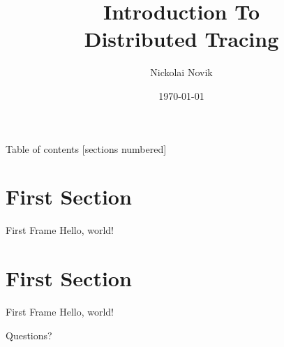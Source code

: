 \documentclass{beamer}
\title{Introduction To \\ Distributed Tracing}
\date{\today}
\author{Nickolai Novik}
\institute{DataRobot}
\begin{document}
  \maketitle

  \begin{frame}{Table of contents}
    [sections numbered]
    \tableofcontents[hideallsubsections]
  \end{frame}
  \section{First Section}
  \begin{frame}{First Frame}
    Hello, world!
  \end{frame}
  \section{First Section}
  \begin{frame}{First Frame}
    Hello, world!
  \end{frame}
\begin{frame}[standout]
  Questions?
\end{frame}
\end{document}
